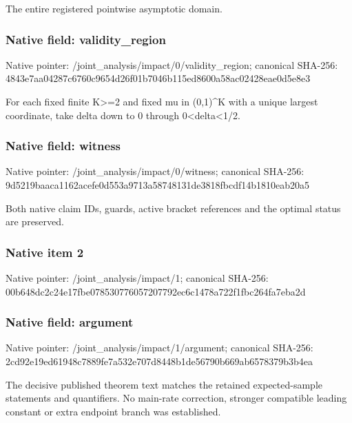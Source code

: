 \documentclass[10pt,a4paper]{article}
\begin{document}
\begingroup\raggedright\sloppy The entire registered pointwise asymptotic domain.\par\endgroup

\subsubsection{Native field: validity\_\allowbreak{}region}
Native pointer: /joint\_\allowbreak{}analysis/impact/0/validity\_\allowbreak{}region; canonical SHA-256: 4843e7aa04287c6760c9654d26f01b7046b115ed8600a58ac02428eae0d5e8e3

\begingroup\raggedright\sloppy For each fixed finite K>=\allowbreak{}2 and fixed mu in (0,\allowbreak{}1)\textasciicircum{}K with a unique largest coordinate,\allowbreak{} take delta down to 0 through 0<delta<1/\allowbreak{}2.\par\endgroup

\subsubsection{Native field: witness}
Native pointer: /joint\_\allowbreak{}analysis/impact/0/witness; canonical SHA-256: 9d5219baaca1162acefe0d553a9713a58748131de3818fbcdf14b1810eab20a5

\begingroup\raggedright\sloppy Both native claim IDs,\allowbreak{} guards,\allowbreak{} active bracket references and the optimal status are preserved.\par\endgroup

\subsubsection{Native item 2}
Native pointer: /joint\_\allowbreak{}analysis/impact/1; canonical SHA-256: 00b648dc2c24e17fbe078530776057207792ec6c1478a722f1fbc264fa7eba2d

\subsubsection{Native field: argument}
Native pointer: /joint\_\allowbreak{}analysis/impact/1/argument; canonical SHA-256: 2cd92e19ed61948c7889fe7a532e707d8448b1de56790b669ab6578379b3b4ea

\begingroup\raggedright\sloppy The decisive published theorem text matches the retained expected-sample statements and quantifiers. No main-rate correction,\allowbreak{} stronger compatible leading constant or extra endpoint branch was established.\par\endgroup
\end{document}
